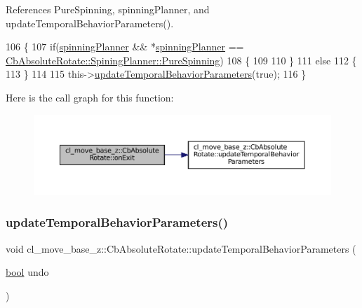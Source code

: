 References Pure\+Spinning, spinning\+Planner, and update\+Temporal\+Behavior\+Parameters().


\begin{DoxyCode}
106 \{
107     \textcolor{keywordflow}{if}(\hyperlink{classcl__move__base__z_1_1CbAbsoluteRotate_a17d836524599af072cf2e3488e491a91}{spinningPlanner} && *\hyperlink{classcl__move__base__z_1_1CbAbsoluteRotate_a17d836524599af072cf2e3488e491a91}{spinningPlanner} == 
      \hyperlink{classcl__move__base__z_1_1CbAbsoluteRotate_ab8d45e43594a3fc6a71c08f07b5dbef0aada5274435681a4ce04175bebfa6652f}{CbAbsoluteRotate::SpiningPlanner::PureSpinning})
108     \{
109 
110     \}
111     \textcolor{keywordflow}{else}
112     \{    
113     \}
114 
115     this->\hyperlink{classcl__move__base__z_1_1CbAbsoluteRotate_a2d8a4200dcacc00ad60c22ad2af5d4b2}{updateTemporalBehaviorParameters}(\textcolor{keyword}{true});
116 \}
\end{DoxyCode}
Here is the call graph for this function\+:
\nopagebreak
\begin{figure}[H]
\begin{center}
\leavevmode
\includegraphics[width=350pt]{classcl__move__base__z_1_1CbAbsoluteRotate_a0e362b8e9f0d7de5aeee183ba4031437_cgraph}
\end{center}
\end{figure}
\mbox{\label{classcl__move__base__z_1_1CbAbsoluteRotate_a2d8a4200dcacc00ad60c22ad2af5d4b2}} 
\subsubsection{\texorpdfstring{update\+Temporal\+Behavior\+Parameters()}{updateTemporalBehaviorParameters()}}
{\footnotesize\ttfamily void cl\+\_\+move\+\_\+base\+\_\+z\+::\+Cb\+Absolute\+Rotate\+::update\+Temporal\+Behavior\+Parameters (\begin{DoxyParamCaption}\item[{\hyperlink{classbool}{bool}}]{undo }\end{DoxyParamCaption})\hspace{0.3cm}{\ttfamily [private]}}



